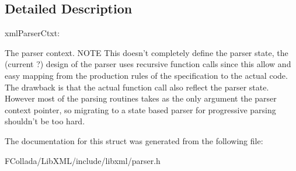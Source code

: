 \subsection{Detailed Description}
xmlParserCtxt:

The parser context. NOTE This doesn't completely define the parser state, the (current ?) design of the parser uses recursive function calls since this allow and easy mapping from the production rules of the specification to the actual code. The drawback is that the actual function call also reflect the parser state. However most of the parsing routines takes as the only argument the parser context pointer, so migrating to a state based parser for progressive parsing shouldn't be too hard. 

The documentation for this struct was generated from the following file:\begin{DoxyCompactItemize}
\item 
FCollada/LibXML/include/libxml/parser.h\end{DoxyCompactItemize}
